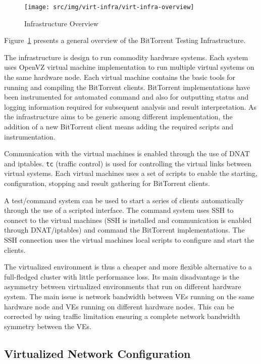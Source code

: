 \begin{figure}
  \begin{center}
    \texttt{[image: src/img/virt-infra/virt-infra-overview]}
  \end{center}
  \caption{Infrastructure Overview}
  \label{fig:virt-infra:infrastructure-overview}
\end{figure}

Figure~\ref{fig:virt-infra:infrastructure-overview} presents a general
overview of the BitTorrent Testing Infrastructure.

The infrastructure is design to run commodity hardware systems. Each system
uses OpenVZ virtual machine implementation to run multiple virtual systems on
the same hardware node.  Each virtual machine contains the basic tools for
running and compiling the BitTorrent clients. BitTorrent implementations have
been instrumented for automated command and also for outputting status and
logging information required for subsequent analysis and result
interpretation. As the infrastructure aims to be generic among different
implementation, the addition of a new BitTorrent client means adding the
required scripts and instrumentation.

Communication with the virtual machines is enabled through the use of DNAT and
iptables. \texttt{tc} (traffic control) is used for controlling the virtual
links between virtual systems. Each virtual machines uses a set of scripts to
enable the starting, configuration, stopping and result gathering for
BitTorrent clients.

A test/command system can be used to start a series of clients automatically
through the use of a scripted interface. The command system uses SSH to
connect to the virtual machines (SSH is installed and communication is enabled
through DNAT/iptables) and command the BitTorrent implementations. The SSH
connection uses the virtual machines local scripts to configure and start the
clients.

The virtualized environment is thus a cheaper and more flexible alternative to
a full-fledged cluster with little performance loss. Its main disadvantage is
the asymmetry between virtualized environments that run on different hardware
system. The main issue is network bandwidth between VEs running on the same
hardware node and VEs running on different hardware nodes. This can be
corrected by using traffic limitation ensuring a complete network bandwidth
symmetry between the VEs.

\subsection{Virtualized Network Configuration}
\label{sec:virt-netconf}

